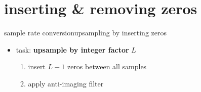         \section{inserting \& removing zeros}
	\begin{frame}{sample rate conversion}{upsampling by inserting zeros}
        \begin{itemize}
            \item   task: \textbf{upsample by integer factor} $L$
            \pause 
            \begin{enumerate}
                \item   insert $L-1$ zeros between all samples
                \item   apply anti-imaging filter
            \end{enumerate}
        \end{itemize}
        \vspace{50mm}
    \end{frame}
